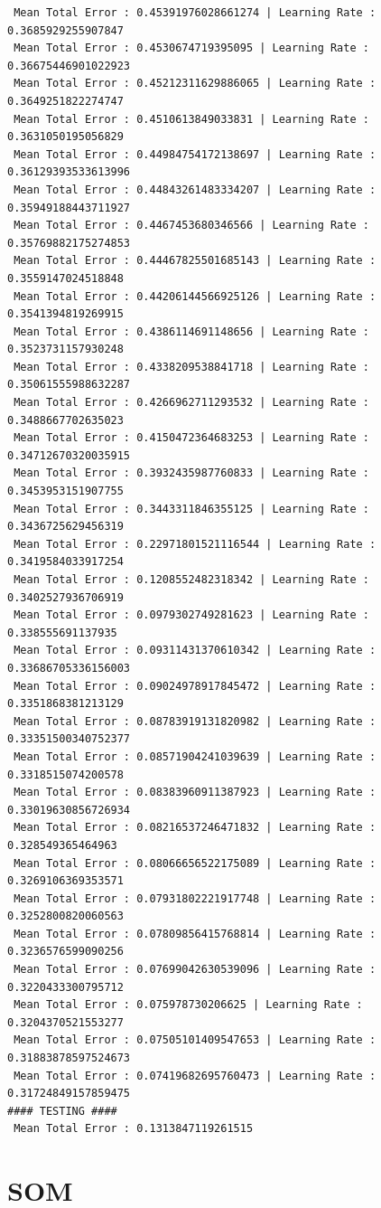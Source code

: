 \documentclass[]{report}
\begin{document}
\begin{verbatim}
 Mean Total Error : 0.45391976028661274 | Learning Rate : 0.3685929255907847
 Mean Total Error : 0.4530674719395095 | Learning Rate : 0.36675446901022923
 Mean Total Error : 0.45212311629886065 | Learning Rate : 0.3649251822274747
 Mean Total Error : 0.4510613849033831 | Learning Rate : 0.3631050195056829
 Mean Total Error : 0.44984754172138697 | Learning Rate : 0.36129393533613996
 Mean Total Error : 0.44843261483334207 | Learning Rate : 0.35949188443711927
 Mean Total Error : 0.4467453680346566 | Learning Rate : 0.35769882175274853
 Mean Total Error : 0.44467825501685143 | Learning Rate : 0.3559147024518848
 Mean Total Error : 0.44206144566925126 | Learning Rate : 0.3541394819269915
 Mean Total Error : 0.4386114691148656 | Learning Rate : 0.3523731157930248
 Mean Total Error : 0.4338209538841718 | Learning Rate : 0.35061555988632287
 Mean Total Error : 0.4266962711293532 | Learning Rate : 0.3488667702635023
 Mean Total Error : 0.4150472364683253 | Learning Rate : 0.34712670320035915
 Mean Total Error : 0.3932435987760833 | Learning Rate : 0.3453953151907755
 Mean Total Error : 0.3443311846355125 | Learning Rate : 0.3436725629456319
 Mean Total Error : 0.22971801521116544 | Learning Rate : 0.3419584033917254
 Mean Total Error : 0.1208552482318342 | Learning Rate : 0.3402527936706919
 Mean Total Error : 0.0979302749281623 | Learning Rate : 0.338555691137935
 Mean Total Error : 0.09311431370610342 | Learning Rate : 0.33686705336156003
 Mean Total Error : 0.09024978917845472 | Learning Rate : 0.3351868381213129
 Mean Total Error : 0.08783919131820982 | Learning Rate : 0.33351500340752377
 Mean Total Error : 0.08571904241039639 | Learning Rate : 0.3318515074200578
 Mean Total Error : 0.08383960911387923 | Learning Rate : 0.33019630856726934
 Mean Total Error : 0.08216537246471832 | Learning Rate : 0.328549365464963
 Mean Total Error : 0.08066656522175089 | Learning Rate : 0.3269106369353571
 Mean Total Error : 0.07931802221917748 | Learning Rate : 0.3252800820060563
 Mean Total Error : 0.07809856415768814 | Learning Rate : 0.3236576599090256
 Mean Total Error : 0.07699042630539096 | Learning Rate : 0.3220433300795712
 Mean Total Error : 0.075978730206625 | Learning Rate : 0.3204370521553277
 Mean Total Error : 0.07505101409547653 | Learning Rate : 0.31883878597524673
 Mean Total Error : 0.07419682695760473 | Learning Rate : 0.31724849157859475
#### TESTING ####
 Mean Total Error : 0.1313847119261515
\end{verbatim}
\section{SOM}
\end{document}
